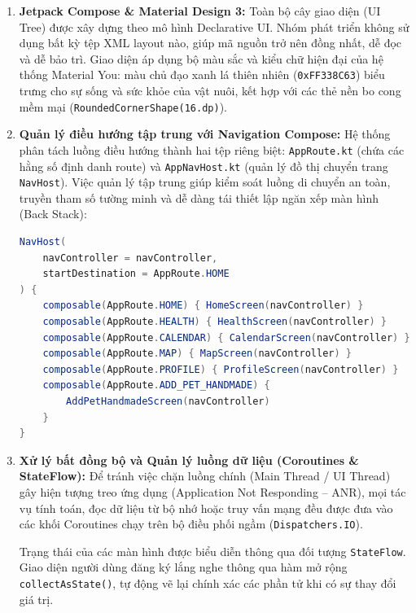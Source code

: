 \begin{enumerate}
    \item \textbf{Jetpack Compose \& Material Design 3:}
    Toàn bộ cây giao diện (UI Tree) được xây dựng theo mô hình Declarative UI. Nhóm phát triển không sử dụng bất kỳ tệp XML layout nào, giúp mã nguồn trở nên đồng nhất, dễ đọc và dễ bảo trì. Giao diện áp dụng bộ màu sắc và kiểu chữ hiện đại của hệ thống Material You: màu chủ đạo xanh lá thiên nhiên (\texttt{0xFF338C63}) biểu trưng cho sự sống và sức khỏe của vật nuôi, kết hợp với các thẻ nền bo cong mềm mại (\texttt{RoundedCornerShape(16.dp)}).

    \item \textbf{Quản lý điều hướng tập trung với Navigation Compose:}
    Hệ thống phân tách luồng điều hướng thành hai tệp riêng biệt: \texttt{AppRoute.kt} (chứa các hằng số định danh route) và \texttt{AppNavHost.kt} (quản lý đồ thị chuyển trang \texttt{NavHost}). Việc quản lý tập trung giúp kiểm soát luồng di chuyển an toàn, truyền tham số tường minh và dễ dàng tái thiết lập ngăn xếp màn hình (Back Stack):

\begin{lstlisting}[language=Java, caption={Đoạn mã cấu hình điều hướng trong AppNavHost.kt}, label={lst:navhost_snippet}]
NavHost(
    navController = navController,
    startDestination = AppRoute.HOME
) {
    composable(AppRoute.HOME) { HomeScreen(navController) }
    composable(AppRoute.HEALTH) { HealthScreen(navController) }
    composable(AppRoute.CALENDAR) { CalendarScreen(navController) }
    composable(AppRoute.MAP) { MapScreen(navController) }
    composable(AppRoute.PROFILE) { ProfileScreen(navController) }
    composable(AppRoute.ADD_PET_HANDMADE) { 
        AddPetHandmadeScreen(navController) 
    }
}
\end{lstlisting}

    \item \textbf{Xử lý bất đồng bộ và Quản lý luồng dữ liệu (Coroutines \& StateFlow):}
    Để tránh việc chặn luồng chính (Main Thread / UI Thread) gây hiện tượng treo ứng dụng (Application Not Responding -- ANR), mọi tác vụ tính toán, đọc dữ liệu từ bộ nhớ hoặc truy vấn mạng đều được đưa vào các khối Coroutines chạy trên bộ điều phối ngầm (\texttt{Dispatchers.IO}).
    
    Trạng thái của các màn hình được biểu diễn thông qua đối tượng \texttt{StateFlow}. Giao diện người dùng đăng ký lắng nghe thông qua hàm mở rộng \texttt{collectAsState()}, tự động vẽ lại chính xác các phần tử khi có sự thay đổi giá trị.
\end{enumerate}


